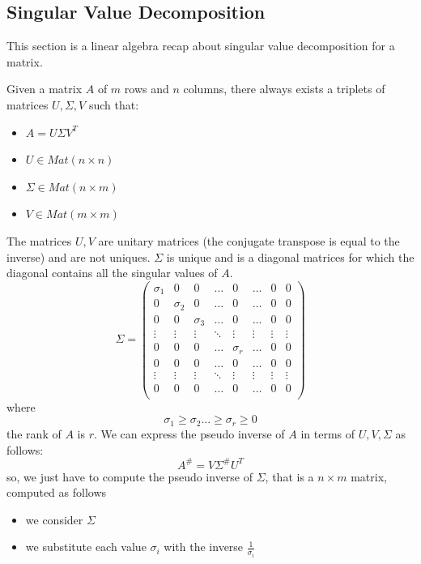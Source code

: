 \documentclass[10pt, letterpaper]{report}
\begin{document}
\subsection{Singular Value Decomposition}
This section is a linear algebra recap about singular value decomposition for a matrix.\begin{definition}
    Given a matrix $A$ of $m$ rows and $n$ columns, there always exists a triplets of matrices $U,\Sigma,V$ such that:\begin{itemize}
        \item $A=U\Sigma V^T$
        \item $U\in Mat(n\times n)$
        \item $\Sigma\in Mat(n\times m)$
        \item $V\in Mat(m\times m)$
    \end{itemize}                                          
\end{definition}
The matrices $U,V$ are unitary matrices (the conjugate transpose is equal to the inverse) and are not uniques.  $\Sigma$ is unique and is a diagonal matrices for which the diagonal contains all the singular values of $A$.
\begin{equation}
    \Sigma=\begin{pmatrix}
        \sigma_1&0&0&\dots &0 &\dots &0& 0\\
        0&\sigma_2&0&\dots &0 &\dots &0& 0\\
        0&0&\sigma_3&\dots &0 &\dots &0& 0\\ 
        \vdots&\vdots&\vdots&\ddots &\vdots &\vdots &\vdots& \vdots\\ 
         0&0&0&\dots &\sigma_r &\dots &0& 0\\ 
         0&0&0&\dots &0 &\dots &0& 0\\ 
         \vdots&\vdots&\vdots&\ddots &\vdots &\vdots &\vdots& \vdots\\ 
         0&0&0&\dots &0 &\dots &0& 0\\ 
    \end{pmatrix}
\end{equation}
where \begin{equation}
    \sigma_1\ge \sigma_2\dots \ge \sigma_r\ge 0 
\end{equation}
the rank of $A$ is $r$. We can express the pseudo inverse of $A$ in terms of $U,V,\Sigma$ as follows:\begin{equation}
    A^\#=V\Sigma^\# U^T
\end{equation}
so, we just have to compute the pseudo inverse of $\Sigma$, that is a $n\times m$ matrix, computed as follows\begin{itemize}
    \item we consider $\Sigma$
    \item we substitute each value $\sigma_i$ with the inverse $\frac{1}{\sigma_i}$
\end{itemize}
\end{document}
